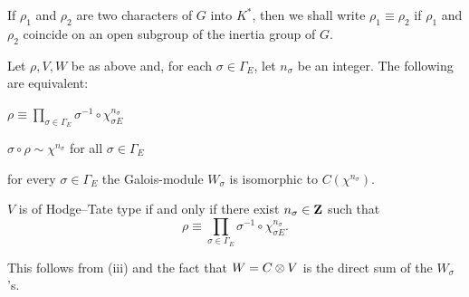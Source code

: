 If $\rho_1$ and $\rho_2$ are two characters of $G$ into $K^*$, then we
shall write $\rho_1\equiv\rho_2$ if $\rho_1$ and $\rho_2$ coincide on
an open subgroup of the inertia group of $G$.

\begin{theorem}[2]\label{thm:III.A.5.2}
Let $\rho,V,W$ be as above and, for each $\sigma\in\Gamma_E$, let
$n_\sigma$ be an integer.  The following are equivalent:
\begin{rlist}
\item $\rho\equiv\prod_{\sigma\in\Gamma_E}
\sigma^{-1}\circ\chi_{\sigma E}^{n_\sigma}$
\item $\sigma\circ\rho\sim\chi^{n_\sigma}$ \quad for all
$\sigma\in\Gamma_E$
\item for every $\sigma\in\Gamma_E$ the Galois-module $W_\sigma$ is
isomorphic to $C(\chi^{n_\sigma})$.
\end{rlist}
{}
\end{theorem}

\begin{corollary}
$V$ is of Hodge--Tate type if and only if there exist
$n_\sigma\in\mathbf{Z}$ such that
\[
\rho\equiv\prod_{\sigma\in\Gamma_E}
\sigma^{-1}\circ\chi_{\sigma E}^{n_\sigma}.
\]
\end{corollary}

This follows from (iii) and the fact that $W=C\mathbin{\otimes} V$ is the direct
sum of the $W_\sigma$'s.

